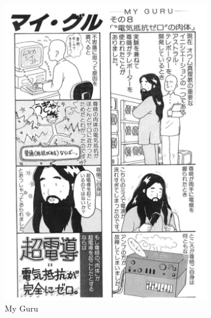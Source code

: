 \documentclass[12pt, letterpaper]{article}
\begin{document}
\begin{figure}[h]
  \caption{Aum Manga}
  \label{fig:aumManga1}
  \centering
  \begin{subfigure}[b]{.4\linewidth}
    \includegraphics[width=\linewidth]{myGuru.png}
    \caption{My Guru}
  \end{subfigure}
  \begin{subfigure}[b]{.4\linewidth}

\end{subfigure}
\end{figure}
\end{document}

